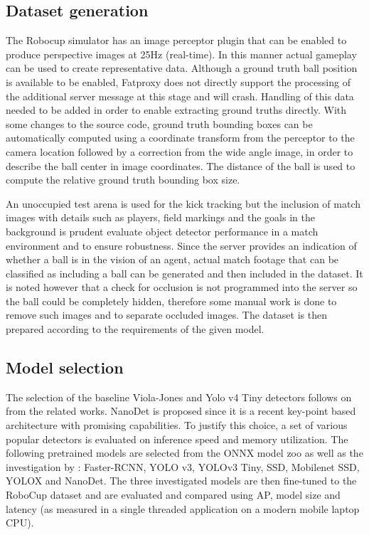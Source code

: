 \documentclass[a4paper,twoside,12pt]{report}
\begin{document}
\subsection{Dataset generation}

The Robocup simulator has an image perceptor plugin that can be enabled to produce perspective images at 25Hz (real-time). In this manner actual gameplay can be used to create representative data. Although a ground truth ball position is available to be enabled, Fatproxy does not directly support the processing of the additional server message at this stage and will crash. Handling of this data needed to be added in order to enable extracting ground truths directly. With some changes to the source code, ground truth bounding boxes can be automatically computed using a coordinate transform from the perceptor to the camera location followed by a correction from the wide angle image, in order to describe the ball center in image coordinates. The distance of the ball is used to compute the relative ground truth bounding box size.

An unoccupied test arena is used for the kick tracking but the inclusion of match images with details such as players, field markings and the goals in the background is prudent evaluate object detector performance in a match environment and to ensure robustness. Since the server provides an indication of whether a ball is in the vision of an agent, actual match footage that can be classified as including a ball can be generated and then included in the dataset. It is noted however that a check for occlusion is not programmed into the server so the ball could be completely hidden, therefore some manual work is done to remove such images and to separate occluded images. The dataset is then prepared according to the requirements of the given model.

\subsection{Model selection}

The selection of the baseline Viola-Jones and Yolo v4 Tiny detectors follows on from the related works. NanoDet is proposed since it is a recent key-point based architecture with promising capabilities. To justify this choice, a set of various popular detectors is evaluated on inference speed and memory utilization. The following pretrained models are selected from the ONNX model zoo \citep{modelzoo} as well as the investigation by \cite{comprehensive}: Faster-RCNN, YOLO v3, YOLOv3 Tiny, SSD, Mobilenet SSD, YOLOX and NanoDet. The three investigated models are then fine-tuned to the RoboCup dataset and are evaluated and compared using AP, model size and latency (as measured in a single threaded application on a modern mobile laptop CPU).
\end{document}
